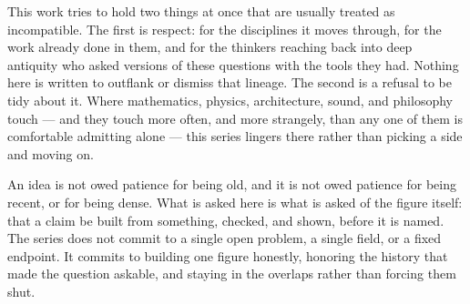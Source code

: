 \documentclass[10pt,a4paper]{article}
\begin{document}
This work tries to hold two things at once that are usually treated as incompatible.
The first is respect: for the disciplines it moves through, for the work already done in them, and for the thinkers reaching back into deep antiquity who asked versions of these questions with the tools they had.
Nothing here is written to outflank or dismiss that lineage.
The second is a refusal to be tidy about it.
Where mathematics, physics, architecture, sound, and philosophy touch --- and they touch more often, and more strangely, than any one of them is comfortable admitting alone --- this series lingers there rather than picking a side and moving on.

An idea is not owed patience for being old, and it is not owed patience for being recent, or for being dense.
What is asked here is what is asked of the figure itself: that a claim be built from something, checked, and shown, before it is named.
The series does not commit to a single open problem, a single field, or a fixed endpoint.
It commits to building one figure honestly, honoring the history that made the question askable, and staying in the overlaps rather than forcing them shut.
\end{document}
